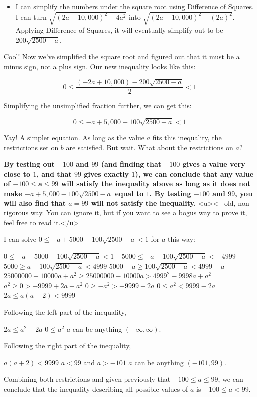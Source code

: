 \begin{enumerate}
            \begin{itemize}
        \item I can simplify the numbers under the square root using Difference of Squares. I can turn $\sqrt{(2a-10,000)^2-4a^2}$ into $\sqrt{(2a-10,000)^2-(2a)^2}$. Applying Difference of Squares, it will eventually simplify out to be $200\sqrt{2500-a}$.
            \end{itemize}
            Cool! Now we've simplified the square root and figured out that it must be a minus sign, not a plus sign. Our new inequality looks like this:

 
 \[0 \leq \frac{(-2a+10,000) - 200\sqrt{2500-a}}{2} < 1\]

 Simplifying the unsimplified fraction further, we can get this:

 
 \[0 \leq -a + 5,000 - 100\sqrt{2500-a} < 1\]

 Yay! A simpler equation. As long as the value $a$ fits this inequality, the restrictions set on $b$ are satisfied. But wait. What about the restrictions on $a$?

 \textbf{By testing out $-100$ and $99$ (and finding that $-100$ gives a value very close to $1$, and that $99$ gives exactly $1$), we can conclude that any value of $-100 \leq$a$\leq 99$ will satisfy the inequality above as long as it does not make $-a + 5,000 - 100\sqrt{2500-a}$ equal to $1$. By testing $-100$ and $99$, you will also find that $a = 99$ will not satisfy the inequality.} <u><-- old, non-rigorous way. You can ignore it, but if you want to see a bogus way to prove it, feel free to read it.</u>

 I can solve $0 \leq -a + 5000 - 100\sqrt{2500-a} < 1$ for $a$ this way:

 $0 \leq -a + 5000 - 100\sqrt{2500-a} < 1$
$-5000 \leq -a - 100\sqrt{2500-a} < -4999$
$5000 \geq a + 100\sqrt{2500-a} < 4999$
$5000-a \geq 100\sqrt{2500-a} < 4999-a$
$25000000-10000a+a^2 \geq 25000000-10000a > 4999^2-9998a+a^2$
$a^2 \geq 0 > -9999+2a+a^2$
$0 \geq -a^2 > -9999+2a$
$0 \leq a^2 < 9999-2a$
$2a \leq a(a+2) < 9999$

 Following the left part of the inequality,

 $2a \leq a^2 + 2a$
$0 \leq a^2$
$a$ can be anything $(-\infty, \infty)$.

 Following the right part of the inequality,

 $a(a+2) < 9999$
$a < 99$ and $a > -101$
$a$ can be anything $(-101, 99)$.

 Combining both restrictions and given previously that $-100 \leq a \leq 99$, we can conclude that the inequality describing all possible values of $a$ is $-100 \leq a < 99$.


\end{enumerate}
